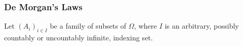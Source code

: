 

\subsubsection*{De Morgan's Laws}
Let $(A_i)_{i\in I}$ be a family of subsets of $\Omega$, where $I$ is an arbitrary, possibly countably or uncountably infinite, indexing set.

